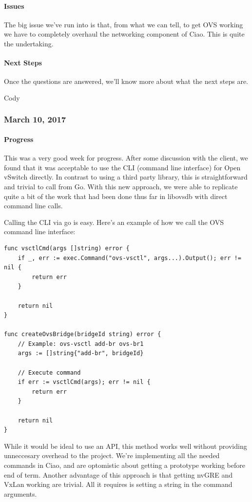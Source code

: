 \documentclass[10pt,onecolumn,journal,draftclsnofoot]{IEEEtran}
\begin{document}
\paragraph{Issues} 

The big issue we've run into is that, from what we can tell, to get OVS
working we have to completely overhaul the networking component of Ciao.
This is quite the undertaking.

\paragraph{Next Steps} 

Once the questions are answered, we'll know more about what the next
steps are.

Cody

\subsubsection{March 10, 2017} 

\paragraph{Progress} 

This was a very good week for progress. After some discussion with the
client, we found that it was acceptable to use the CLI (command line
interface) for Open vSwitch directly. In contrast to using a third party
library, this is straightforward and trivial to call from Go. With this
new approach, we were able to replicate quite a bit of the work that had
been done thus far in libovsdb with direct command line calls.

Calling the CLI via go is easy. Here's an example of how we call the OVS
command line interface:

\begin{lstlisting}
func vsctlCmd(args []string) error {
    if _, err := exec.Command("ovs-vsctl", args...).Output(); err != nil {
        return err
    }

    return nil
}

func createOvsBridge(bridgeId string) error {
    // Example: ovs-vsctl add-br ovs-br1
    args := []string{"add-br", bridgeId}

    // Execute command
    if err := vsctlCmd(args); err != nil {
        return err
    }

    return nil
}
\end{lstlisting}

While it would be ideal to use an API, this method works well without
providing unneccesary overhead to the project. We're implementing all
the needed commands in Ciao, and are optomistic about getting a
prototype working before end of term. Another advantage of this approach
is that getting nvGRE and VxLan working are trivial. All it requires is
setting a string in the command arguments.
\end{document}
